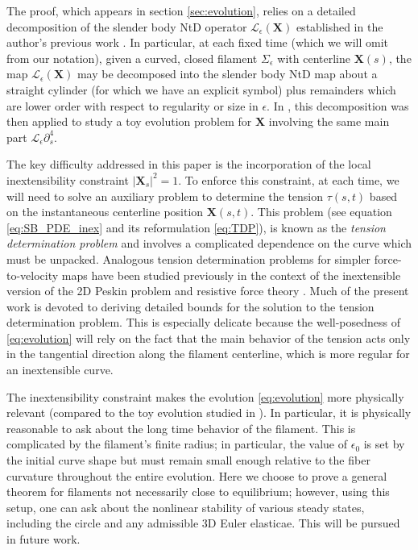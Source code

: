 \documentclass[11pt,reqno]{amsart}
\newcommand{\X}{\bm{X}}
\newcommand{\p}{\partial}
\newcommand{\abs}[1]{\left\lvert #1 \right\rvert}
\newcommand{\mc}[1]{\mathcal{#1}}
\theoremstyle{definition}
\begin{document}
The proof, which appears in section \ref{sec:evolution}, relies on a detailed decomposition of the slender body NtD operator $\mc{L}_\epsilon(\X)$ established in the author's previous work \cite{ohm2024free}. In particular, at each fixed time (which we will omit from our notation), given a curved, closed filament $\Sigma_\epsilon$ with centerline $\X(s)$, the map $\mc{L}_\epsilon(\X)$ may be decomposed into the slender body NtD map about a straight cylinder (for which we have an explicit symbol) plus remainders which are lower order with respect to regularity or size in $\epsilon$. In \cite{ohm2024free}, this decomposition was then applied to study a toy evolution problem for $\X$ involving the same main part $\mc{L}_\epsilon\p_s^4$. 

The key difficulty addressed in this paper is the incorporation of the local inextensibility constraint $\abs{\X_s}^2=1$. To enforce this constraint, at each time, we will need to solve an auxiliary problem to determine the tension $\tau(s,t)$ based on the instantaneous centerline position $\X(s,t)$. This problem (see equation \eqref{eq:SB_PDE_inex} and its reformulation \eqref{eq:TDP}), is known as the \emph{tension determination problem} and involves a complicated dependence on the curve which must be unpacked.  
Analogous tension determination problems for simpler force-to-velocity maps have been studied previously in the context of the inextensible version of the 2D Peskin problem \cite{kuo2023tension,garcia2025immersed} and resistive force theory \cite{mori2023well,albritton2025rods}.
Much of the present work is devoted to deriving detailed bounds for the solution to the tension determination problem. This is especially delicate because the well-posedness of \eqref{eq:evolution} will rely on the fact that the main behavior of the tension acts only in the tangential direction along the filament centerline, which is more regular for an inextensible curve. 

The inextensibility constraint makes the evolution \eqref{eq:evolution} more physically relevant (compared to the toy evolution studied in \cite{ohm2024free}). In particular, it is physically reasonable to ask about the long time behavior of the filament. This is complicated by the filament's finite radius; in particular, the value of $\epsilon_0$ is set by the initial curve shape but must remain small enough relative to the fiber curvature throughout the entire evolution. Here we choose to prove a general theorem for filaments not necessarily close to equilibrium; however, using this setup, one can ask about the nonlinear stability of various steady states, including the circle and any admissible 3D Euler elasticae. This will be pursued in future work. 
\end{document}
